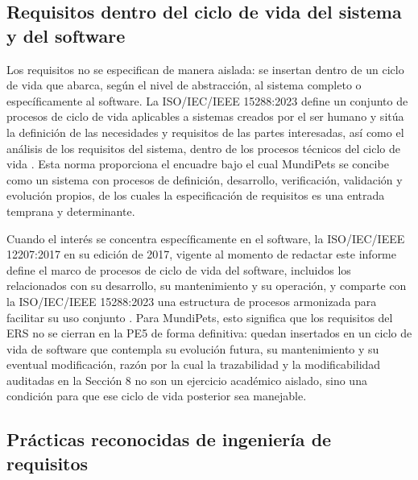 \documentclass[journal,onecolumn]{IEEEtran}
\begin{document}
	\subsection*{Requisitos dentro del ciclo de vida del sistema y del software}
	
	Los requisitos no se especifican de manera aislada: se insertan dentro de un ciclo de vida que
	abarca, según el nivel de abstracción, al sistema completo o específicamente al software. La
	ISO/IEC/IEEE 15288:2023 define un conjunto de procesos de ciclo de vida aplicables a sistemas creados
	por el ser humano y sitúa la definición de las necesidades y requisitos de las partes interesadas, así
	como el análisis de los requisitos del sistema, dentro de los procesos técnicos del ciclo de vida
	\cite{iso15288}. Esta norma proporciona el encuadre bajo el cual MundiPets se concibe como un sistema
	con procesos de definición, desarrollo, verificación, validación y evolución propios, de los cuales la
	especificación de requisitos es una entrada temprana y determinante.
	
	Cuando el interés se concentra específicamente en el software, la ISO/IEC/IEEE 12207:2017 en su
	edición de 2017, vigente al momento de redactar este informe define el marco de procesos de ciclo
	de vida del software, incluidos los relacionados con su desarrollo, su mantenimiento y su operación, y
	comparte con la ISO/IEC/IEEE 15288:2023 una estructura de procesos armonizada para facilitar su uso
	conjunto \cite{iso12207}. Para MundiPets, esto significa que los requisitos del ERS no se cierran en la
	PE5 de forma definitiva: quedan insertados en un ciclo de vida de software que contempla su evolución
	futura, su mantenimiento y su eventual modificación, razón por la cual la trazabilidad y la
	modificabilidad auditadas en la Sección 8 no son un ejercicio académico aislado, sino una condición
	para que ese ciclo de vida posterior sea manejable.
	
	\subsection*{Prácticas reconocidas de ingeniería de requisitos}
	
\end{document}
